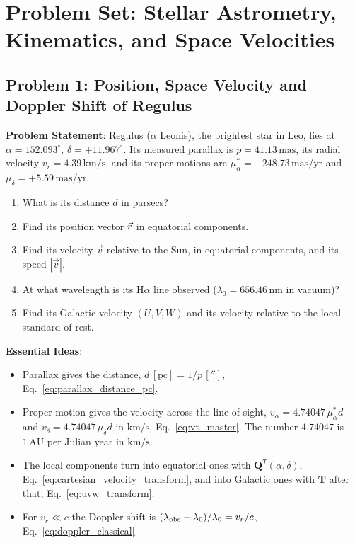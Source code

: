 \section[Problem Set: Astrometry and Kinematics]{Problem Set: Stellar Astrometry, Kinematics, and Space Velocities}

\subsection{Problem 1: Position, Space Velocity and Doppler Shift of Regulus}
\label{as:prob:space_velocity}

\textbf{Problem Statement}: Regulus ($\alpha$ Leonis), the brightest star in Leo, lies at $\alpha = 152.093^\circ$, $\delta = +11.967^\circ$. Its measured parallax is $p = 41.13\,\mathrm{mas}$, its radial velocity $v_r = 4.39\,\mathrm{km/s}$, and its proper motions are $\mu_\alpha^* = -248.73\,\mathrm{mas/yr}$ and $\mu_\delta = +5.59\,\mathrm{mas/yr}$.
\begin{enumerate}[label=(\alph*)]
	\item What is its distance $d$ in parsecs?
	\item Find its position vector $\vec r$ in equatorial components.
	\item Find its velocity $\vec v$ relative to the Sun, in equatorial components, and its speed $|\vec v|$.
	\item At what wavelength is its $\mathrm{H}\alpha$ line observed ($\lambda_0 = 656.46\,\mathrm{nm}$ in vacuum)?
	\item Find its Galactic velocity $(U,V,W)$ and its velocity relative to the local standard of rest.
\end{enumerate}

\textbf{Essential Ideas}:
\begin{itemize}
	\item Parallax gives the distance, $d\,[\mathrm{pc}] = 1/p\,['']$, Eq.~\eqref{eq:parallax_distance_pc}.
	\item Proper motion gives the velocity across the line of sight, $v_\alpha = 4.74047\,\mu_\alpha^*d$ and $v_\delta = 4.74047\,\mu_\delta d$ in $\mathrm{km/s}$, Eq.~\eqref{eq:vt_master}. The number $4.74047$ is $1\,\mathrm{AU}$ per Julian year in $\mathrm{km/s}$.
	\item The local components turn into equatorial ones with $\mathbf Q^T(\alpha,\delta)$, Eq.~\eqref{eq:cartesian_velocity_transform}, and into Galactic ones with $\mathbf T$ after that, Eq.~\eqref{eq:uvw_transform}.
	\item For $v_r\ll c$ the Doppler shift is $(\lambda_{\rm obs}-\lambda_0)/\lambda_0 = v_r/c$, Eq.~\eqref{eq:doppler_classical}.
\end{itemize}

